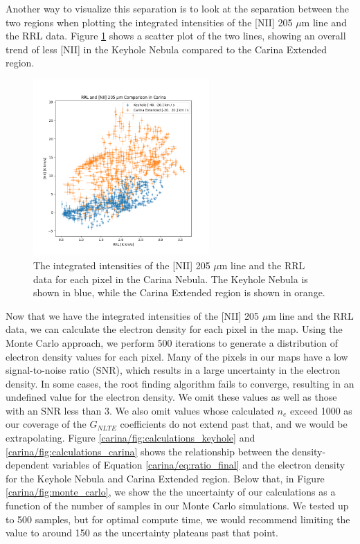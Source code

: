Another way to visualize this separation is to look at the separation between the two regions when plotting the integrated intensities of the [NII] 205 $\mu$m line and the RRL data.
Figure \ref{carina/fig:intensity_scatter} shows a scatter plot of the two lines, showing an overall trend of less [NII] in the Keyhole Nebula compared to the Carina Extended region.

\begin{figure}
    \centering
    \includegraphics[width=0.6\textwidth]{figs/carina/intensity_scatter.png}
    \caption[Integrated Intensities of {[}NII{]} 205 $\mu$m Line and RRL Data]{
        The integrated intensities of the [NII] 205 $\mu$m line and the RRL data for each pixel in the Carina Nebula.
        The Keyhole Nebula is shown in blue, while the Carina Extended region is shown in orange.
        }
    \label{carina/fig:intensity_scatter}
\end{figure}

Now that we have the integrated intensities of the [NII] 205 $\mu$m line and the RRL data, we can calculate the electron density for each pixel in the map.
Using the Monte Carlo approach, we perform 500 iterations to generate a distribution of electron density values for each pixel.
Many of the pixels in our maps have a low signal-to-noise ratio (SNR), which results in a large uncertainty in the electron density.
In some cases, the root finding algorithm fails to converge, resulting in an undefined value for the electron density.
We omit these values as well as those with an SNR less than 3.
We also omit values whose calculated $n_e$ exceed 1000 as our coverage of the $G_{NLTE}$ coefficients do not extend past that, and we would be extrapolating. 
Figure \ref{carina/fig:calculations_keyhole} and \ref{carina/fig:calculations_carina} shows the relationship between the density-dependent variables of Equation \ref{carina/eq:ratio_final} and the electron density for the Keyhole Nebula and Carina Extended region.
Below that, in Figure \ref{carina/fig:monte_carlo}, we show the the uncertainty of our calculations as a function of the number of samples in our Monte Carlo simulations.
We tested up to 500 samples, but for optimal compute time, we would recommend limiting the value to around 150 as the uncertainty plateaus past that point. 

